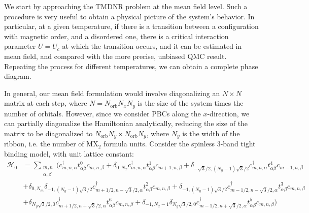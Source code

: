 We start by approaching the \acs{TMDNR} problem at the mean field level.
Such a procedure is very useful to obtain a physical picture of the system's behavior.
In particular, at a given temperature, if there is a transition between a configuration with magnetic order, and a disordered one, there is a critical interaction parameter $U = U_c$ at which the transition occurs, and it can be estimated in mean field, and compared with the more precise, unbiased \acs{QMC} result.
Repeating the process for different temperatures, we can obtain a complete phase diagram.

In general, our mean field formulation would involve diagonalizing an $N \times N$ matrix at each step, where $N = N_{\text{orb}} N_x N_y$ is the size of the system times the number of orbitals.
However, since we consider \acs{PBC}s along the $x$-direction, we can partially diagonalize  the Hamiltonian analytically, reducing the size of the matrix to be diagonalized to $N_{\text{orb}} N_y \times N_{\text{orb}} N_y$, where $N_y$ is the width of the ribbon, i.e. the number of $\text{M}\text{X}_2$ formula units.
Consider the spinless 3-band tight binding model, with unit lattice constant:
\begin{equation}
\begin{split}
\mathcal{H}_0 &= \sum_{\substack{m, n \\ \alpha, \beta}} \bigg( c_{m,n, \alpha}^\dagger t_{\alpha\beta}^0 c_{m, n, \beta} + \delta_{0, N_x}  c_{m,n, \alpha}^\dagger t_{\alpha\beta}^1 c_{m+1, n, \beta} + \delta_{-\sqrt{3}/2, (N_y -1)\sqrt{3}/2}  c_{m,n, \alpha}^\dagger t_{\alpha\beta}^4 c_{m-1, n, \beta} \\
& + \delta_{0, N_m} \delta_{-1, (N_y -1)\sqrt{3}/2} c_{m+1/2,n-\sqrt{3}/2, \alpha}^\dagger t_{\alpha\beta}^2 c_{m, n, \beta} + \delta_{-1, (N_y -1)\sqrt{3}/2} c_{m-1/2,n-\sqrt{3}/2, \alpha}^\dagger t_{\alpha\beta}^3 c_{m, n, \beta} \\
& + \delta_{N_y\sqrt{3}/2, 0} c_{m+1/2,n+\sqrt{3}/2, \alpha}^\dagger t_{\alpha\beta}^6 c_{m, n, \beta} + \delta_{-1, N_x -1} \delta_{N_y\sqrt{3}/2, 0} c_{m-1/2,n+\sqrt{3}/2, \alpha}^\dagger t_{\alpha\beta}^5 c_{m, n, \beta} \bigg)
\end{split}
\end{equation}

